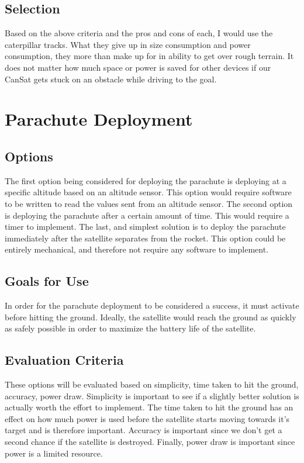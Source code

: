 \documentclass[10pt,letterpaper,onecolumn,journal]{IEEEtran}
\begin{document}
\subsection{Selection}
Based on the above criteria and the pros and cons of each, I would use the caterpillar tracks. What they give up in size consumption and power consumption, they more than make up for in ability to get over rough terrain. It does not matter how much space or power is saved for other devices if our CanSat gets stuck on an obstacle while driving to the goal.


\section{Parachute Deployment}

\subsection{Options}
The first option being considered for deploying the parachute is deploying at a specific altitude based on an altitude sensor. This option would require software to be written to read the values sent from an altitude sensor. The second option is deploying the parachute after a certain amount of time. This would require a timer to implement. The last, and simplest solution is to deploy the parachute immediately after the satellite separates from the rocket. This option could be entirely mechanical, and therefore not require any software to implement.
\subsection{Goals for Use}
In order for the parachute deployment to be considered a success, it must activate before hitting the ground. Ideally, the satellite would reach the ground as quickly as safely possible in order to maximize the battery life of the satellite.
\subsection{Evaluation Criteria}
These options will be evaluated based on simplicity, time taken to hit the ground, accuracy, power draw. Simplicity is important to see if a slightly better solution is actually worth the effort to implement. The time taken to hit the ground has an effect on how much power is used before the satellite starts moving towards it’s target and is therefore important. Accuracy is important since we don’t get a second chance if the satellite is destroyed. Finally, power draw is important since power is a limited resource.
\end{document}
